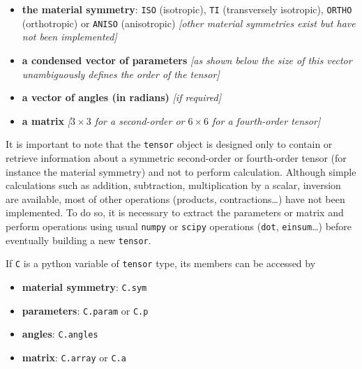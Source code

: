 \documentclass[
  a4paper,
  numbers=noendperiod,
  DIV=12]{scrreprt}
\providecommand{\tightlist}{%
  \setlength{\itemsep}{0pt}\setlength{\parskip}{0pt}}
\begin{document}
\begin{itemize}
\tightlist
\item
  \textbf{the material symmetry}: \texttt{ISO} (isotropic), \texttt{TI}
  (transversely isotropic), \texttt{ORTHO} (orthotropic) or
  \texttt{ANISO} (anisotropic) \emph{{[}other material symmetries exist
  but have not been implemented{]}}
\item
  \textbf{a condensed vector of parameters} \emph{{[}as shown below the
  size of this vector unambiguously defines the order of the tensor{]}}
\item
  \textbf{a vector of angles (in radians)} \emph{{[}if required{]}}
\item
  \textbf{a matrix} \emph{{[}\(3×3\) for a second-order or \(6×6\) for a
  fourth-order tensor{]}}
\end{itemize}

\begin{tcolorbox}[enhanced jigsaw, arc=.35mm, bottomrule=.15mm, bottomtitle=1mm, breakable, colback=white, colbacktitle=quarto-callout-warning-color!10!white, colframe=quarto-callout-warning-color-frame, coltitle=black, left=2mm, leftrule=.75mm, opacityback=0, opacitybacktitle=0.6, rightrule=.15mm, title=\textcolor{quarto-callout-warning-color}{\faExclamationTriangle}\hspace{0.5em}{Warning}, titlerule=0mm, toprule=.15mm, toptitle=1mm]

It is important to note that the \texttt{tensor} object is designed only
to contain or retrieve information about a symmetric second-order or
fourth-order tensor (for instance the material symmetry) and not to
perform calculation. Although simple calculations such as addition,
subtraction, multiplication by a scalar, inversion are available, most
of other operations (products, contractions\ldots) have not been
implemented. To do so, it is necessary to extract the parameters or
matrix and perform operations using usual \texttt{numpy} or
\texttt{scipy} operations (\texttt{dot}, \texttt{einsum}\ldots) before
eventually building a new \texttt{tensor}.

\end{tcolorbox}

If \texttt{C} is a python variable of \texttt{tensor} type, its members
can be accessed by

\begin{itemize}
\tightlist
\item
  \textbf{material symmetry}: \texttt{C.sym}
\item
  \textbf{parameters}: \texttt{C.param} or \texttt{C.p}
\item
  \textbf{angles}: \texttt{C.angles}
\item
  \textbf{matrix}: \texttt{C.array} or \texttt{C.a}
\end{itemize}
\end{document}
